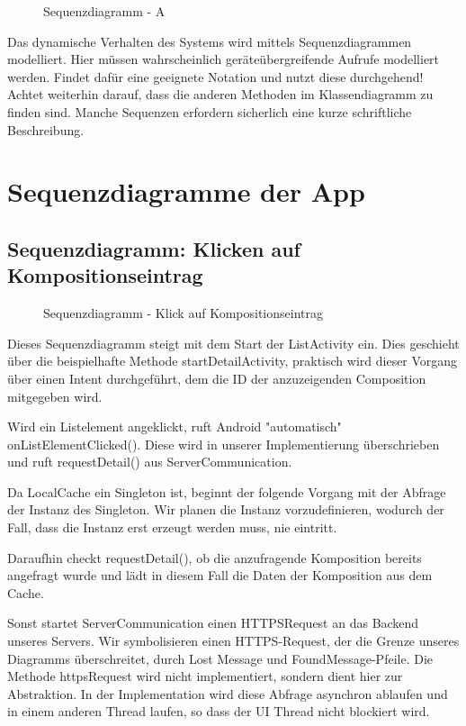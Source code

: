 \begin{figure}[h]
	\centering
	\caption{Sequenzdiagramm - A}
	\label{fig:sequenz-a}
\end{figure}


\begin{tcolorbox}
Das dynamische Verhalten des Systems wird mittels Sequenzdiagrammen modelliert.
Hier müssen wahrscheinlich geräteübergreifende Aufrufe modelliert werden.
Findet dafür eine geeignete Notation und nutzt diese durchgehend! 
Achtet weiterhin darauf, dass die anderen Methoden im Klassendiagramm zu finden sind.
Manche Sequenzen erfordern sicherlich eine kurze schriftliche Beschreibung.
\end{tcolorbox}

\section*{Sequenzdiagramme der App}
\subsection*{Sequenzdiagramm: Klicken auf Kompositionseintrag}

\begin{figure}[h]
	\centering
	\caption{Sequenzdiagramm - Klick auf Kompositionseintrag}
	\label{fig:sequenz-a}
\end{figure}

Dieses Sequenzdiagramm steigt mit dem Start der ListActivity ein. Dies geschieht über die beispielhafte Methode startDetailActivity, praktisch wird dieser Vorgang über einen Intent durchgeführt, dem die ID der anzuzeigenden Composition mitgegeben wird.

Wird ein Listelement angeklickt, ruft Android "automatisch" onListElementClicked(). Diese wird in unserer Implementierung überschrieben und ruft requestDetail() aus ServerCommunication. 

Da LocalCache ein Singleton ist, beginnt der folgende Vorgang mit der Abfrage der Instanz des Singleton. Wir planen die Instanz vorzudefinieren, wodurch der Fall, dass die Instanz erst erzeugt werden muss, nie eintritt.

Daraufhin checkt requestDetail(), ob die anzufragende Komposition bereits angefragt wurde und lädt in diesem Fall die Daten der Komposition aus dem Cache.

Sonst startet ServerCommunication einen HTTPSRequest an das Backend unseres Servers. Wir symbolisieren einen HTTPS-Request, der die Grenze unseres Diagramms überschreitet, durch Lost Message und FoundMessage-Pfeile. Die Methode httpsRequest wird nicht implementiert, sondern dient hier zur Abstraktion. In der Implementation wird diese Abfrage asynchron ablaufen und in einem anderen Thread laufen, so dass der UI Thread nicht blockiert wird. 

